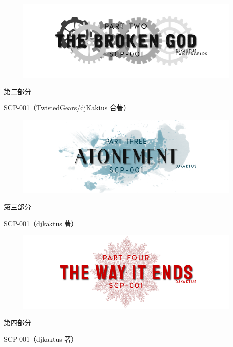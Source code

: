 \hr

\begin{figure}[H]
    \centering
    \includegraphics[width=0.8\linewidth]{images/SCP-001-ouroboros-3.png}
\end{figure}

\begin{scpbox}
\begin{center}
第二部分


SCP-001（TwistedGears/djKaktus 合著）
\end{center}
\end{scpbox}

\hr

\begin{figure}[H]
    \centering
    \includegraphics[width=0.8\linewidth]{images/SCP-001-ouroboros-4.png}
\end{figure}

\begin{scpbox}
\begin{center}
第三部分


SCP-001（djkaktus 著）
\end{center}
\end{scpbox}

\hr

\begin{figure}[H]
    \centering
    \includegraphics[width=0.8\linewidth]{images/SCP-001-ouroboros-5.png}
\end{figure}

\begin{scpbox}
\begin{center}
第四部分


SCP-001（djkaktus 著）
\end{center}
\end{scpbox}

\newpage



\newpage



\newpage


